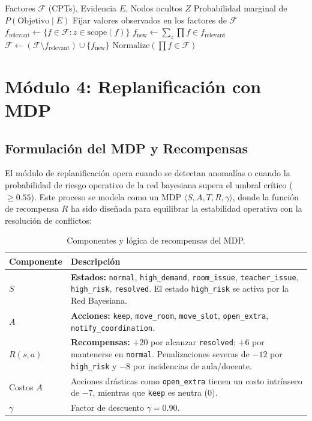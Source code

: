\documentclass[12pt,twoside]{report}
\theoremstyle{definition}
\begin{document}
\begin{algorithm}[H]
\caption{Inferencia por Eliminaci\'on de Variables (VE)}
\label{alg:risk}
\begin{algorithmic}[1]
\Require Factores $\mathcal{F}$ (CPTs), Evidencia $E$, Nodos ocultos $Z$
\Ensure Probabilidad marginal de $P(\text{Objetivo} \mid E)$
\State Fijar valores observados en los factores de $\mathcal{F}$
  \State $f_{\text{relevant}} \leftarrow \{f \in \mathcal{F} : z \in \text{scope}(f)\}$
  \State $f_{\text{new}} \leftarrow \sum_z \prod f \in f_{\text{relevant}}$
  \State $\mathcal{F} \leftarrow (\mathcal{F} \setminus f_{\text{relevant}}) \cup \{f_{\text{new}}\}$
\EndFor
\State \Return $\text{Normalize}(\prod f \in \mathcal{F})$
\end{algorithmic}
\end{algorithm}

\section{M\'odulo 4: Replanificaci\'on con MDP}

\subsection{Formulaci\'on del MDP y Recompensas}

El m\'odulo de replanificaci\'on opera cuando se detectan anomal\'ias o cuando la probabilidad de riesgo operativo de la red bayesiana supera el umbral cr\'itico ($\geq 0.55$). Este proceso se modela como un MDP $\langle S, A, T, R, \gamma \rangle$, donde la funci\'on de recompensa $R$ ha sido dise\~nada para equilibrar la estabilidad operativa con la resoluci\'on de conflictos:

\begin{table}[H]
\centering
\caption{Componentes y l\'ogica de recompensas del MDP.}
\label{tab:mdp}
\begin{tabular}{lp{10cm}}
\toprule
\textbf{Componente} & \textbf{Descripci\'on} \\
\midrule
$S$ & \textbf{Estados:} \texttt{normal}, \texttt{high\_demand}, \texttt{room\_issue}, \texttt{teacher\_issue}, \texttt{high\_risk}, \texttt{resolved}. El estado \texttt{high\_risk} se activa por la Red Bayesiana. \\
$A$ & \textbf{Acciones:} \texttt{keep}, \texttt{move\_room}, \texttt{move\_slot}, \texttt{open\_extra}, \texttt{notify\_coordination}. \\
$R(s,a)$ & \textbf{Recompensas:} $+20$ por alcanzar \texttt{resolved}; $+6$ por mantenerse en \texttt{normal}. Penalizaciones severas de $-12$ por \texttt{high\_risk} y $-8$ por incidencias de aula/docente. \\
Costos $A$ & Acciones dr\'asticas como \texttt{open\_extra} tienen un costo intr\'inseco de $-7$, mientras que \texttt{keep} es neutra ($0$). \\
$\gamma$ & Factor de descuento $\gamma = 0.90$. \\
\bottomrule
\end{tabular}
\end{table}
\end{document}
